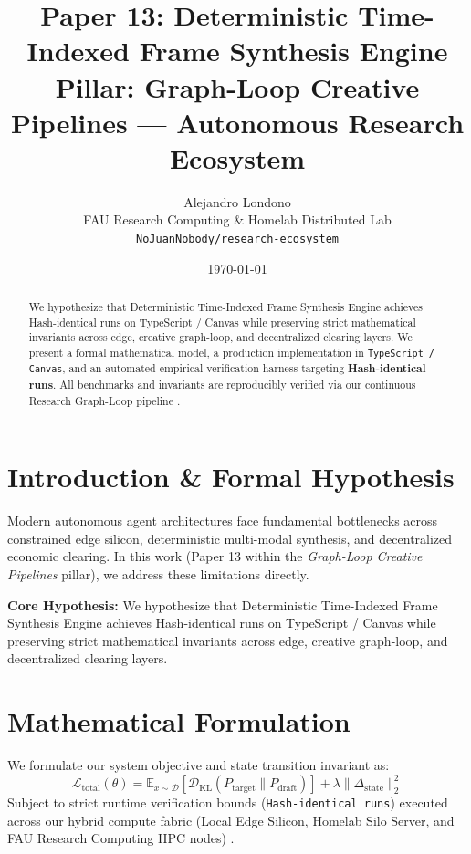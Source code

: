 \documentclass[10pt,twocolumn]{article}
\title{\textbf{Paper 13: Deterministic Time-Indexed Frame Synthesis Engine}\\
\large Pillar: Graph-Loop Creative Pipelines --- Autonomous Research Ecosystem}
\author{
  Alejandro Londono \\
  FAU Research Computing \& Homelab Distributed Lab \\
  \texttt{NoJuanNobody/research-ecosystem}
}
\date{\today}
\begin{document}
\maketitle

\begin{abstract}
We hypothesize that Deterministic Time-Indexed Frame Synthesis Engine achieves Hash-identical runs on TypeScript / Canvas while preserving strict mathematical invariants across edge, creative graph-loop, and decentralized clearing layers.
We present a formal mathematical model, a production implementation in \texttt{TypeScript / Canvas}, and an automated empirical verification harness targeting \textbf{Hash-identical runs}. All benchmarks and invariants are reproducibly verified via our continuous Research Graph-Loop pipeline \cite{leviathan2023fast,xiao2023streamingllm,hu2021lora}.
\end{abstract}

\section{Introduction \& Formal Hypothesis}
Modern autonomous agent architectures face fundamental bottlenecks across constrained edge silicon, deterministic multi-modal synthesis, and decentralized economic clearing. In this work (Paper 13 within the \textit{Graph-Loop Creative Pipelines} pillar), we address these limitations directly.

\textbf{Core Hypothesis:} We hypothesize that Deterministic Time-Indexed Frame Synthesis Engine achieves Hash-identical runs on TypeScript / Canvas while preserving strict mathematical invariants across edge, creative graph-loop, and decentralized clearing layers.

\section{Mathematical Formulation}
We formulate our system objective and state transition invariant as:
\begin{equation}
\mathcal{L}_{\text{total}}(\theta) = \mathbb{E}_{x \sim \mathcal{D}}\left[\mathcal{D}_{\text{KL}}(P_{\text{target}} \parallel P_{\text{draft}})\right] + \lambda \|\Delta_{\text{state}}\|_2^2
\end{equation}
Subject to strict runtime verification bounds (\texttt{Hash-identical runs}) executed across our hybrid compute fabric (Local Edge Silicon, Homelab Silo Server, and FAU Research Computing HPC nodes) \cite{rafailov2023dpo,shapley1953value,hanson2003combinatorial}.
\end{document}
